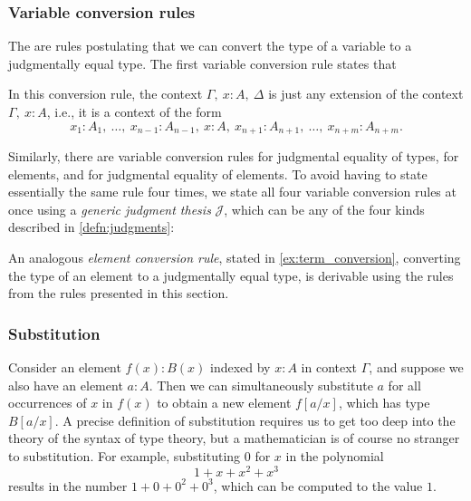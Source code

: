 \subsubsection*{Variable conversion rules}
The  are rules postulating that we can convert the type of a variable to a judgmentally equal type. The first variable conversion rule states that
\begin{prooftree}
\end{prooftree}
In this conversion rule, the context $\Gamma,~x:A,~\Delta$ is just any extension of the context $\Gamma,~x:A$, i.e., it is a context of the form
\begin{equation*}
  x_1:A_1,~\ldots,~x_{n-1}:A_{n-1},~x:A,~x_{n+1}:A_{n+1},~\ldots,~x_{n+m}:A_{n+m}.
\end{equation*}

Similarly, there are variable conversion rules for judgmental equality of types, for elements, and for judgmental equality of elements. To avoid having to state essentially the same rule four times, we state all four variable conversion rules at once using a \emph{generic judgment thesis} $\mathcal{J}$, which can be any of the four kinds described in \cref{defn:judgments}:
\begin{prooftree}
\end{prooftree}
An analogous \emph{element conversion rule}, stated in \cref{ex:term_conversion}, converting the type of an element to a judgmentally equal type, is derivable using the rules from the rules presented in this section.

\subsubsection*{Substitution}

Consider an element $f(x):B(x)$ indexed by $x:A$ in context $\Gamma$, and suppose we also have an element $a:A$. Then we can simultaneously substitute $a$ for all occurrences of $x$ in $f(x)$ to obtain a new element $f[a/x]$, which has type $B[a/x]$. A precise definition of substitution requires us to get too deep into the theory of the syntax of type theory, but a mathematician is of course no stranger to substitution. For example, substituting $0$ for $x$ in the polynomial
\begin{equation*}
  1+x+x^2+x^3
\end{equation*}
results in the number $1+0+0^2+0^3$, which can be computed to the value $1$.


